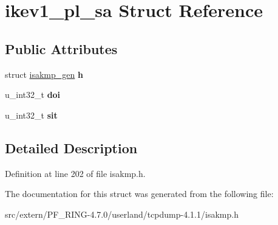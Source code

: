 \hypertarget{structikev1__pl__sa}{
\section{ikev1\_\-pl\_\-sa Struct Reference}
\label{structikev1__pl__sa}
}
\subsection*{Public Attributes}
\begin{DoxyCompactItemize}
\item 
\hypertarget{structikev1__pl__sa_afadec3aad40d85096362ae3b8e2d58eb}{
struct \hyperlink{structisakmp__gen}{isakmp\_\-gen} {\bfseries h}}
\label{structikev1__pl__sa_afadec3aad40d85096362ae3b8e2d58eb}

\item 
\hypertarget{structikev1__pl__sa_a3861c5fba6dbbc90ba2844bccfce17d5}{
u\_\-int32\_\-t {\bfseries doi}}
\label{structikev1__pl__sa_a3861c5fba6dbbc90ba2844bccfce17d5}

\item 
\hypertarget{structikev1__pl__sa_a0191d50fc0e6acb2929026260d812778}{
u\_\-int32\_\-t {\bfseries sit}}
\label{structikev1__pl__sa_a0191d50fc0e6acb2929026260d812778}

\end{DoxyCompactItemize}


\subsection{Detailed Description}


Definition at line 202 of file isakmp.h.



The documentation for this struct was generated from the following file:\begin{DoxyCompactItemize}
\item 
src/extern/PF\_\-RING-\/4.7.0/userland/tcpdump-\/4.1.1/isakmp.h\end{DoxyCompactItemize}

